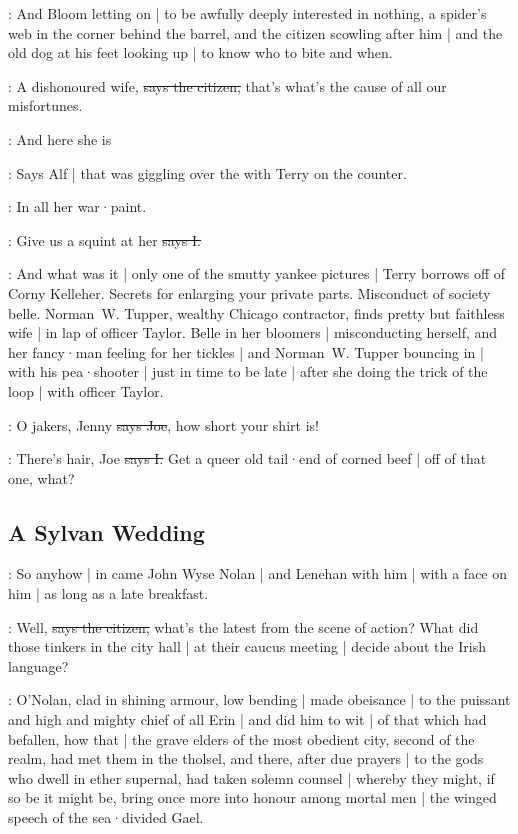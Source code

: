 \Nq:
And Bloom letting on |
to be awfully deeply interested in nothing,
a spider's web in the corner behind the barrel,
and the citizen scowling after him |
and the old dog at his feet looking up |
to know who to bite and when.

\citizen:
A dishonoured wife,
\sout{says the citizen,}
that's what's the cause of all our misfortunes.

\bergan:
And here she is

\Nq:
Says Alf |
that was giggling over the 
with Terry on the counter.

\bergan:
In all her war·paint.

:
Give us a squint at her
\sout{says I.}

\Nq:
And what was it |
only one of the smutty yankee pictures |
Terry borrows off of Corny Kelleher.
Secrets for enlarging your private parts.
Misconduct of society belle.
Norman~W. Tupper,
wealthy Chicago contractor,
finds pretty but faithless wife |
in lap of officer Taylor.
Belle in her bloomers |
misconducting herself,
and her fancy·man feeling for her tickles |
and Norman~W. Tupper bouncing in |
with his pea·shooter |
just in time to be late |
after she doing the trick of the loop |
with officer Taylor.

\joe:
O jakers,
Jenny
\sout{says Joe},
how short your shirt is!

:
There's hair,
Joe
\sout{says I.}
Get a queer old tail·end of corned beef |
off of that one,
what?


\subsection*{A Sylvan Wedding}

\Nq:
So anyhow |
in came John Wyse Nolan |
and Lenehan with him |
with a face on him |
as long as a late breakfast.

\citizen:
Well,
\sout{says the citizen,}
what's the latest from the scene of action?
What did those tinkers in the city hall |
at their caucus meeting |
decide about the Irish language?

:
O'Nolan,
clad in shining armour,
low bending |
made obeisance |
to the puissant and high and mighty chief of all Erin |
and did him to wit |
of that which had befallen,
how that |
the grave elders of the most obedient city,
second of the realm,
had met them in the tholsel,
and there,
after due prayers |
to the gods who dwell in ether supernal,
had taken solemn counsel |
whereby they might,
if so be it might be,
bring once more into honour among mortal men |
the winged speech of the sea·divided Gael.

